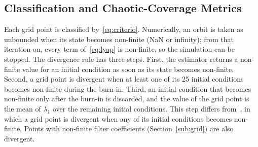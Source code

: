 \documentclass[journal]{IEEEtran}
\begin{document}
\subsection{Classification and Chaotic-Coverage Metrics}\label{sub:metrics}
Each grid point is classified by~\eqref{eq:criterio}. Numerically, an orbit is
taken as unbounded when its state becomes non-finite (NaN or infinity); from
that iteration on, every term of~\eqref{eq:lyap} is non-finite, so the
simulation can be stopped. The divergence rule has three steps. First, the
estimator returns a non-finite value for an initial condition as soon as its
state becomes non-finite. Second, a grid point is divergent when at least one
of its 25 initial conditions becomes non-finite during the burn-in. Third, an
initial condition that becomes non-finite only after the burn-in is
discarded, and the value of the grid point is the mean of $\lambda_1$ over the
remaining initial conditions. This step differs from~\cite{BorgesCNSNS2024}, in
which a grid point is divergent when any of its initial conditions becomes
non-finite. Points with non-finite filter coefficients
(Section~\ref{sub:grid}) are also divergent.
\end{document}

